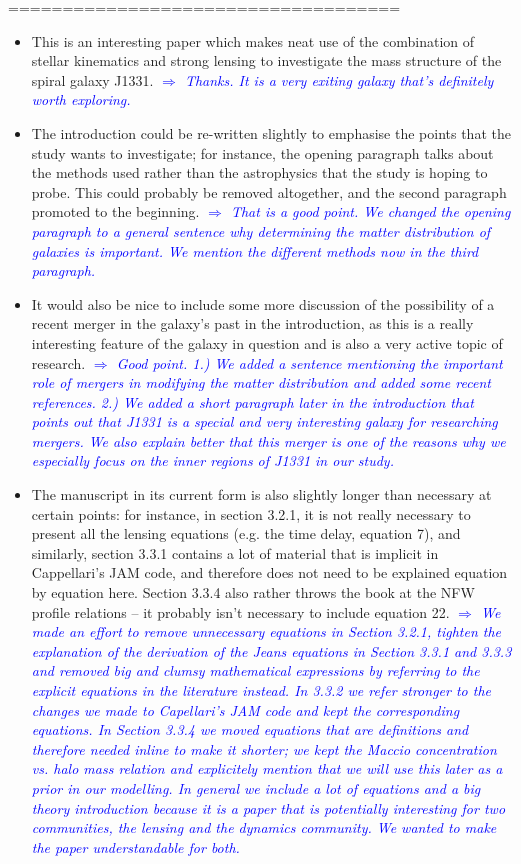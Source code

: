 \documentclass[10pt,a4paper]{article}
\newcommand{\Comment}[1]{\textsl{\textcolor{Blue}{$\Longrightarrow$ {#1}}}}
\begin{document}
====================================
\begin{itemize}

\item This is an interesting paper which makes neat use of the combination of stellar
kinematics and strong lensing to investigate the mass structure of the spiral galaxy
J1331. 
\Comment{Thanks. It is a very exiting galaxy that's definitely worth exploring.}

\item The introduction could be re-written slightly to emphasise the points that the study
wants to investigate; for instance, the opening paragraph talks about the methods
used rather than the astrophysics that the study is hoping to probe. This could
probably be removed altogether, and the second paragraph promoted to the beginning. 
\Comment{That is a good point. We changed the opening paragraph to a general sentence why determining the matter distribution of galaxies is important. We mention the different methods now in the third paragraph.}

\item It would also be nice to include some more discussion of the possibility of a recent
merger in the galaxy's past in the introduction, as this is a really interesting
feature of the galaxy in question and is also a very active topic of research. \Comment{Good point. 1.) We added a sentence mentioning the important role of mergers in modifying the matter distribution and added some recent references. 2.) We added a short paragraph later in the introduction that points out that J1331 is a special and very interesting galaxy for researching mergers. We also explain better that this merger is one of the reasons why we especially focus on the inner regions of J1331 in our study.}

\item The manuscript in its current form is also slightly longer than necessary at certain
points: for instance, in section 3.2.1, it is not really necessary to present all
the lensing equations (e.g. the time delay, equation 7), and similarly, section
3.3.1 contains a lot of material that is implicit in Cappellari's JAM code, and
therefore does not need to be explained equation by equation here. Section 3.3.4
also rather throws the book at the NFW profile relations – it probably isn't
necessary to include equation 22. \Comment{We made an effort to remove unnecessary equations in Section 3.2.1, tighten the explanation of the derivation of the Jeans equations in Section 3.3.1 and 3.3.3 and removed big and clumsy mathematical expressions by referring to the explicit equations in the literature instead. In 3.3.2 we refer stronger to the changes we made to Capellari's JAM code and kept the corresponding equations. In Section 3.3.4 we moved equations that are definitions and therefore needed inline to make it shorter; we kept the Maccio concentration vs. halo mass relation and explicitely mention that we will use this later as a prior in our modelling. In general we include a lot of equations and a big theory introduction because it is a paper that is potentially interesting for two communities, the lensing and the dynamics community. We wanted to make the paper understandable for both.}


\end{itemize}
\end{document}
